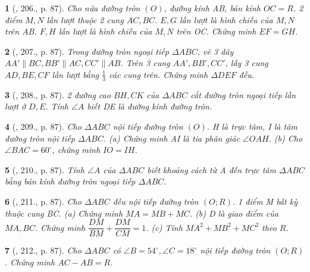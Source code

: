 \documentclass{article}
\newtheorem{baitoan}{}
\begin{document}
\begin{baitoan}[\cite{Binh_Toan_9_tap_2}, 206., p. 87]
	Cho nửa đường tròn $(O)$, đường kính AB, bán kính $OC = R$. 2 điểm $M,N$ lần lượt thuộc 2 cung $AC,BC$. $E,G$ lần lượt là hình chiếu của $M,N$ trên AB. $F,H$ lần lượt là hình chiếu của $M,N$ trên OC. Chứng minh $EF = GH$.
\end{baitoan}

\begin{baitoan}[\cite{Binh_Toan_9_tap_2}, 207., p. 87]
	Trong đường tròn ngoại tiếp $\Delta ABC$, vẽ 3 dây $AA'\parallel BC,BB'\parallel AC,CC'\parallel AB$. Trên 3 cung $AA',BB',CC'$, lấy 3 cung $AD,BE,CF$ lần lượt bằng $\frac{1}{3}$ các cung trên. Chứng minh $\Delta DEF$ đều.
\end{baitoan}

\begin{baitoan}[\cite{Binh_Toan_9_tap_2}, 208., p. 87]
	2 đường cao $BH,CK$ của $\Delta ABC$ cắt đường tròn ngoại tiếp lần lượt ở $D,E$. Tính $\angle{A}$ biết DE là đường kính đường tròn.
\end{baitoan}

\begin{baitoan}[\cite{Binh_Toan_9_tap_2}, 209., p. 87]
	Cho $\Delta ABC$ nội tiếp đường tròn $(O)$. H là trực tâm, I là tâm đường tròn nội tiếp $\Delta ABC$. (a) Chứng minh AI là tia phân giác $\angle{OAH}$. (b) Cho $\angle{BAC} = 60^\circ$, chứng minh $IO = IH$.
\end{baitoan}

\begin{baitoan}[\cite{Binh_Toan_9_tap_2}, 210., p. 87]
	Tính $\angle{A}$ của $\Delta ABC$ biết khoảng cách từ A đến trực tâm $\Delta ABC$ bằng bán kính đường tròn ngoại tiếp $\Delta ABC$.
\end{baitoan}

\begin{baitoan}[\cite{Binh_Toan_9_tap_2}, 211., p. 87]
	Cho $\Delta ABC$ đều nội tiếp đường tròn $(O;R)$. 1 điểm M bất kỳ thuộc cung BC. (a) Chứng minh $MA = MB + MC$. (b) D là giao điểm của $MA,BC$. Chứng minh $\dfrac{DM}{BM}  + \dfrac{DM}{CM} = 1$. (c) Tính $MA^2 + MB^2 + MC^2$ theo $R$.
\end{baitoan}

\begin{baitoan}[\cite{Binh_Toan_9_tap_2}, 212., p. 87]
	Cho $\Delta ABC$ có $\angle{B} = 54^\circ,\angle{C} = 18^\circ$ nội tiếp đường tròn $(O;R)$. Chứng minh $AC - AB = R$.
\end{baitoan}
\end{document}
